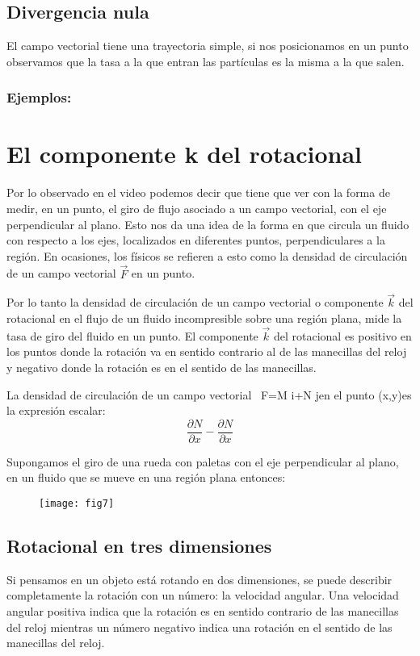 \documentclass[10pt]{article}
\begin{document}
\subsection{Divergencia nula}%
	\parindent=0.2in
	\hangindent=0.2in
	El campo vectorial tiene una trayectoria simple, si nos posicionamos en un punto observamos que la tasa a la que entran las partículas es la misma a la que salen.

\subsubsection{Ejemplos:}%
	\parindent=0.4in
	\hangindent=0.4in

\section{El componente k del rotacional}
	Por lo observado en el video podemos decir que tiene que ver con la forma de medir, en un punto, el giro de flujo asociado a un campo vectorial, con el eje perpendicular al plano. Esto nos da una idea de la forma en que circula un fluido con respecto a los ejes, localizados en diferentes puntos, perpendiculares a la región. En ocasiones, los físicos se refieren a esto como la densidad de circulación de un campo vectorial $\vec{F}$ en un punto.

	Por lo tanto la densidad de circulación de un campo vectorial o componente $\vec{k}$ del rotacional en el flujo de un fluido incompresible sobre una región plana, mide la tasa de giro del fluido en un punto. El componente $\vec{k}$ del rotacional es positivo en los puntos donde la rotación va en sentido contrario al de las manecillas del reloj y negativo donde la rotación es en el sentido de las manecillas.

	La densidad de circulación de un campo vectorial  F=M i+N jen el punto (x,y)es la expresión escalar: 
	\[ \frac{\partial N}{\partial x} - \frac{\partial N}{\partial x} \]

	Supongamos el giro de una rueda con paletas con el eje perpendicular al plano, en un fluido que se mueve en una región plana entonces:

	\begin{figure}[h]
		\texttt{[image: fig7]}
	\centering
	\end{figure}

\subsection{Rotacional en tres dimensiones}%
	\parindent=0.2in
	\hangindent=0.2in
	Si pensamos en un objeto está rotando en dos dimensiones, se puede describir completamente la rotación con un número: la velocidad angular. Una velocidad angular positiva indica que la rotación es en sentido contrario de las manecillas del reloj mientras un número negativo indica una rotación en el sentido de las manecillas del reloj.
\end{document}
